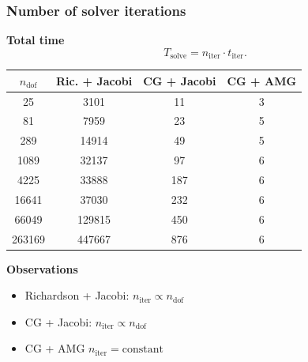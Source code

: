 \documentclass{beamer}
\begin{document}

\begin{frame}
  \frametitle{Number of solver iterations}
\textbf{Total time}
$$
T_{\text{solve}} = n_{\text{iter}}\cdot t_{\text{iter}}.
$$
\begin{center}
\begin{tabular}{cccc}
  \hline
 $n_{\text{dof}}$ & Ric. + Jacobi & CG + Jacobi & CG + AMG\\
 \hline\hline
 25 & 3101 & 11 & 3 \\
 81 & 7959 & 23 & 5 \\
 289 & 14914 & 49 & 5 \\
 1089 & 32137 & 97 & 6 \\
 4225 & 33888 & 187 & 6 \\
 16641 & 37030 & 232 & 6 \\
 66049 & 129815 & 450 & 6 \\
 263169 & 447667 & 876 & 6 \\
\hline
\end{tabular}
\end{center}
\textbf{Observations}
\begin{itemize}
  \item Richardson + Jacobi: $n_{\text{iter}}\propto n_{\text{dof}}$
  \item CG + Jacobi: $n_{\text{iter}}\propto n_{\text{dof}}$
  \item CG + AMG $n_{\text{iter}} = \text{constant}$
\end{itemize}
\end{frame}

\end{document}
